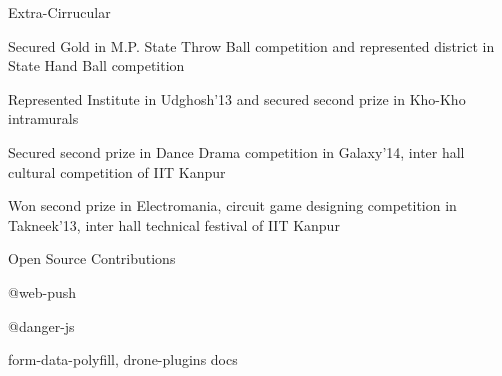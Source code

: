 \documentclass{resume} %
\begin{document}
\begin{rSection}{Extra-Cirrucular} \itemsep -3pt
\item Secured Gold in M.P. State Throw Ball competition and represented district in State Hand Ball competition
\item Represented Institute in Udghosh’13 and secured second prize in Kho-Kho intramurals
\item Secured second prize in Dance Drama competition in Galaxy’14, inter hall cultural competition of IIT Kanpur
\item Won second prize in Electromania, circuit game designing competition in Takneek’13, inter hall technical festival of IIT Kanpur

\end{rSection}

\begin{rSection}{Open Source Contributions}
\item @web-push
\item @danger-js
\item form-data-polyfill, drone-plugins docs
\end{rSection}
\end{document}
